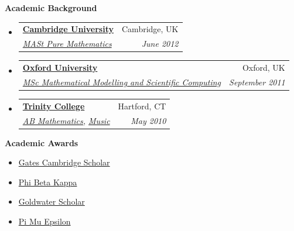 \documentclass[letterpaper,11pt]{article}
\makeatletter
\newcommand{\resitem}[1]{\item #1 \vspace{-1pt}}
\newcommand{\resheading}[1]{{\large \colorbox{mygrey}{\begin{minipage}{\textwidth}{\textbf{#1 \vphantom{p\^{E}}}}\end{minipage}}}}
\newcommand{\ressubheading}[4]{
\begin{tabular*}{6.5in}{l@{\extracolsep{\fill}}r}
		\textbf{#1} & #2 \\
		\textit{#3} & \textit{#4} \\
\end{tabular*}\vspace{-6pt}}
\makeatother
\begin{document}
\resheading{\Large{Academic Background}}
\large
	\begin{itemize}
		\item
			\ressubheading{\href{http://www.cam.ac.uk/}{Cambridge University}}{Cambridge, UK}{\href{http://www.maths.cam.ac.uk/postgrad/mathiii/}{MASt Pure Mathematics}} {June 2012}
		\item
			\ressubheading{\href{http://www.ox.ac.uk}{Oxford University}}{Oxford, UK}{\href{https://www.maths.ox.ac.uk/members/students/postgraduate-courses/msc-mmsc}{MSc Mathematical Modelling and Scientific Computing}} {September 2011}

			
		\item
			\ressubheading{\href{http://www.trincoll.edu/}{Trinity College}}{Hartford, CT}{{\href{http://www.trincoll.edu/Academics/MajorsAndMinors/Mathematics/Pages/default.aspx}{AB Mathematics,}} {\href{http://www.trincoll.edu/Academics/MajorsAndMinors/Music/Pages/default.aspx}{Music}}}{May 2010}

	\end{itemize} 
	
	
%		
	
\resheading{\Large{Academic Awards}}
\begin{multicols}{2}
	\begin{itemize}
	\large
		\resitem{\href{http://www.gatescambridge.org/our-scholars/Profile.aspx?ScholarID=5646}{Gates Cambridge Scholar}}
		\resitem{\href{http://www.pbk.org/home/index.aspx}{Phi Beta Kappa}}
		\resitem{\href{http://www.act.org/goldwater/}{Goldwater Scholar}}
		\resitem{\href{http://www.pme-math.org/}{Pi Mu Epsilon}}

	\end{itemize}
\end{multicols}
\end{document}
